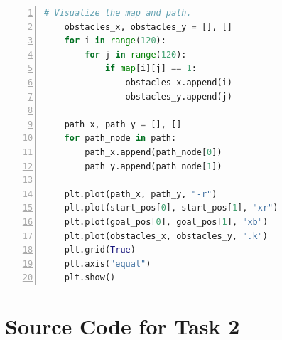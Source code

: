 \documentclass[aps,letterpaper,10pt]{revtex4}
\begin{document}
\begin{lstlisting}[language=Python, caption={Source Code for Task 1 (5-Task\_1.py)}, label={lst:task1_code}, basicstyle=\ttfamily\small, numbers=left, frame=tb, breaklines=true]
    # Visualize the map and path.
    obstacles_x, obstacles_y = [], []
    for i in range(120):
        for j in range(120):
            if map[i][j] == 1:
                obstacles_x.append(i)
                obstacles_y.append(j)

    path_x, path_y = [], []
    for path_node in path:
        path_x.append(path_node[0])
        path_y.append(path_node[1])

    plt.plot(path_x, path_y, "-r")
    plt.plot(start_pos[0], start_pos[1], "xr")
    plt.plot(goal_pos[0], goal_pos[1], "xb")
    plt.plot(obstacles_x, obstacles_y, ".k")
    plt.grid(True)
    plt.axis("equal")
    plt.show()
\end{lstlisting}

\newpage
\section{Source Code for Task 2}
\label{sec:appendix_task2}
\end{document}
